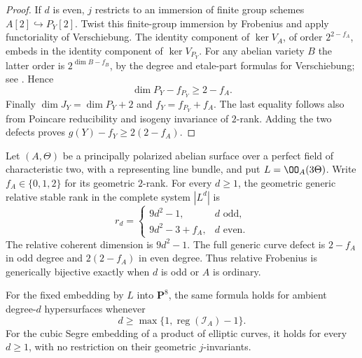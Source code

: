 \begin{proof}
If $d$ is even, $j$ restricts to an immersion of finite group schemes
$A[2]\hookrightarrow P_Y[2]$.  Twist this finite-group immersion by
Frobenius and apply functoriality of Verschiebung.  The identity
component of $\ker V_A$, of order $2^{2-f_A}$, embeds in the identity
component of $\ker V_{P_Y}$.  For any abelian variety $B$ the latter
order is $2^{\dim B-f_B}$, by the degree and etale-part formulas for
Verschiebung; see \cite[Propositions~5.20--5.22, pp.~80--81]
{EdixhovenVanDerGeerMoonenAV}.  Hence
\[
              \dim P_Y-f_{P_Y}\ge2-f_A.
\]
Finally $\dim J_Y=\dim P_Y+2$ and $f_Y=f_{P_Y}+f_A$.
The last equality follows also from Poincare reducibility and
isogeny invariance of $2$-rank.  Adding the two defects proves
$g(Y)-f_Y\ge2(2-f_A)$.
\end{proof}

\begin{theorem}
\label{thm:DE-A3-ppav-ranks}
Let $(A,\Theta)$ be a principally polarized abelian surface over a
perfect field of characteristic two, with a representing line bundle,
and put $L=\OO_A(3\Theta)$.  Write $f_A\in\{0,1,2\}$ for its
geometric $2$-rank.  For every $d\ge1$, the geometric generic relative
stable rank in the complete system $|L^d|$ is
\begin{equation}\label{eq:DE-A3-ppav-rank-formula}
 \boxed{\qquad
 r_d=\begin{cases}
           9d^2-1,&d\text{ odd},\\
           9d^2-3+f_A,&d\text{ even}.
       \end{cases}\qquad}
\end{equation}
The relative coherent dimension is $9d^2-1$.  The full generic curve
defect is $2-f_A$ in odd degree and $2(2-f_A)$ in even degree.
Thus relative Frobenius is generically bijective exactly when $d$ is
odd or $A$ is ordinary.

For the fixed embedding by $L$ into $\mathbf P^8$, the same formula
holds for ambient degree-$d$ hypersurfaces whenever
\[
             d\ge\max\{1,\operatorname{reg}(\mathcal I_A)-1\}.
\]
For the cubic Segre embedding of a product of elliptic curves, it holds
for every $d\ge1$, with no restriction on their geometric
$j$-invariants.
\end{theorem}
